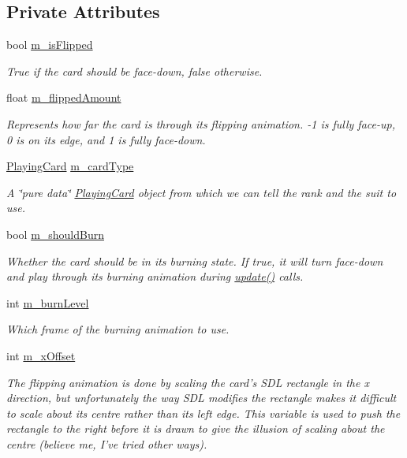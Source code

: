 \subsection*{Private Attributes}
\begin{DoxyCompactItemize}
\item 
bool \hyperlink{classGUI_1_1Card_ab7003a9c8f143d8c7043cf571220fb4f}{m\-\_\-is\-Flipped}
\begin{DoxyCompactList}\small\item\em True if the card should be face-\/down, false otherwise. \end{DoxyCompactList}\item 
float \hyperlink{classGUI_1_1Card_aae7758b01b93defe544558f4b8b4b976}{m\-\_\-flipped\-Amount}
\begin{DoxyCompactList}\small\item\em Represents how far the card is through its flipping animation. -\/1 is fully face-\/up, 0 is on its edge, and 1 is fully face-\/down. \end{DoxyCompactList}\item 
\hyperlink{classPlayingCard}{Playing\-Card} \hyperlink{classGUI_1_1Card_a1823124410a8235ef0afbb0b51420f41}{m\-\_\-card\-Type}
\begin{DoxyCompactList}\small\item\em A \char`\"{}pure data\char`\"{} \hyperlink{classPlayingCard}{Playing\-Card} object from which we can tell the rank and the suit to use. \end{DoxyCompactList}\item 
bool \hyperlink{classGUI_1_1Card_aed05e56f3810f9175504587a4eee601d}{m\-\_\-should\-Burn}
\begin{DoxyCompactList}\small\item\em Whether the card should be in its burning state. If true, it will turn face-\/down and play through its burning animation during \hyperlink{classGUI_1_1Card_a678aebdd57e220cbada5e15996743a10}{update()} calls. \end{DoxyCompactList}\item 
int \hyperlink{classGUI_1_1Card_a5558831a2e8f343229fa9288a0e2a3d3}{m\-\_\-burn\-Level}
\begin{DoxyCompactList}\small\item\em Which frame of the burning animation to use. \end{DoxyCompactList}\item 
int \hyperlink{classGUI_1_1Card_a2a1360126f9b6e21043347762d360aca}{m\-\_\-x\-Offset}
\begin{DoxyCompactList}\small\item\em The flipping animation is done by scaling the card's S\-D\-L rectangle in the x direction, but unfortunately the way S\-D\-L modifies the rectangle makes it difficult to scale about its centre rather than its left edge. This variable is used to push the rectangle to the right before it is drawn to give the illusion of scaling about the centre (believe me, I've tried other ways). \end{DoxyCompactList}\end{DoxyCompactItemize}
